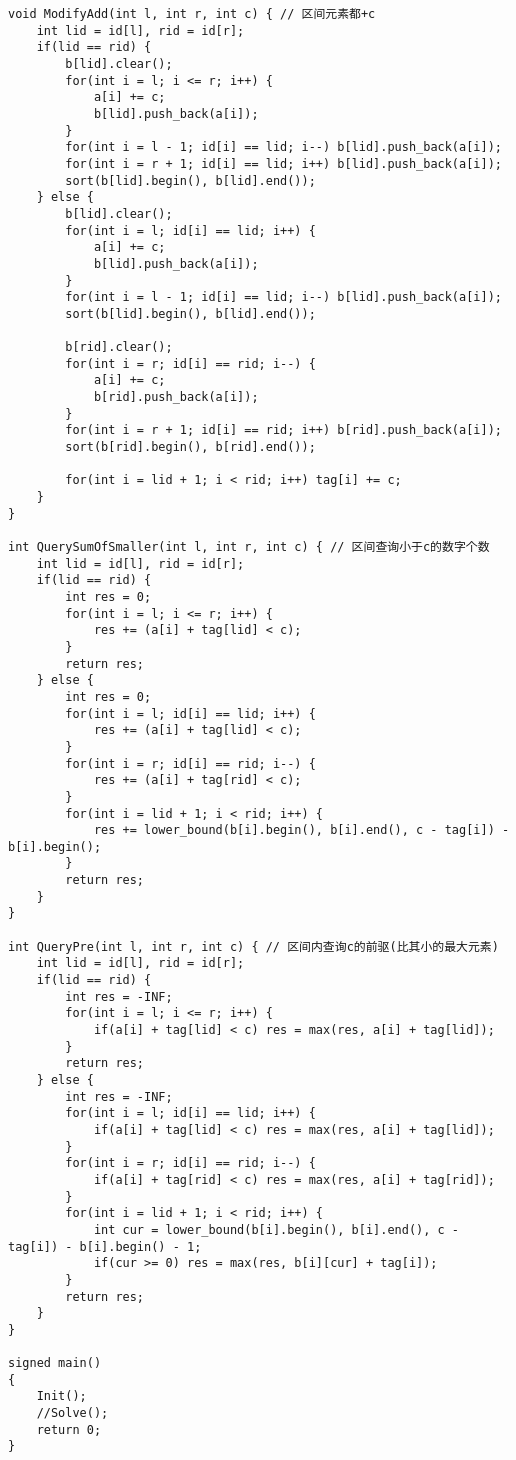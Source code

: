 \begin{lstlisting}
void ModifyAdd(int l, int r, int c) { // 区间元素都+c
	int lid = id[l], rid = id[r];
	if(lid == rid) {
		b[lid].clear();
		for(int i = l; i <= r; i++) {
			a[i] += c;
			b[lid].push_back(a[i]);	
		}
		for(int i = l - 1; id[i] == lid; i--) b[lid].push_back(a[i]);
		for(int i = r + 1; id[i] == lid; i++) b[lid].push_back(a[i]);
		sort(b[lid].begin(), b[lid].end());
	} else {
		b[lid].clear();
		for(int i = l; id[i] == lid; i++) {
			a[i] += c;
			b[lid].push_back(a[i]);
		}
		for(int i = l - 1; id[i] == lid; i--) b[lid].push_back(a[i]);
		sort(b[lid].begin(), b[lid].end());
		
		b[rid].clear();
		for(int i = r; id[i] == rid; i--) {
			a[i] += c;
			b[rid].push_back(a[i]);
		}
		for(int i = r + 1; id[i] == rid; i++) b[rid].push_back(a[i]);
		sort(b[rid].begin(), b[rid].end());
		
		for(int i = lid + 1; i < rid; i++) tag[i] += c;
	}
}

int QuerySumOfSmaller(int l, int r, int c) { // 区间查询小于c的数字个数
	int lid = id[l], rid = id[r];
	if(lid == rid) {
		int res = 0;
		for(int i = l; i <= r; i++) {
			res += (a[i] + tag[lid] < c);
		}
		return res;
	} else {
		int res = 0;
		for(int i = l; id[i] == lid; i++) {
			res += (a[i] + tag[lid] < c);
		}
		for(int i = r; id[i] == rid; i--) {
			res += (a[i] + tag[rid] < c);
		}
		for(int i = lid + 1; i < rid; i++) {
			res += lower_bound(b[i].begin(), b[i].end(), c - tag[i]) - b[i].begin();
		}
		return res;
	}
}

int QueryPre(int l, int r, int c) { // 区间内查询c的前驱(比其小的最大元素)
	int lid = id[l], rid = id[r];
	if(lid == rid) {
		int res = -INF;
		for(int i = l; i <= r; i++) {
			if(a[i] + tag[lid] < c) res = max(res, a[i] + tag[lid]);
		}
		return res;
	} else {
		int res = -INF;
		for(int i = l; id[i] == lid; i++) {
			if(a[i] + tag[lid] < c) res = max(res, a[i] + tag[lid]);
		}
		for(int i = r; id[i] == rid; i--) {
			if(a[i] + tag[rid] < c) res = max(res, a[i] + tag[rid]);
		}
		for(int i = lid + 1; i < rid; i++) {
			int cur = lower_bound(b[i].begin(), b[i].end(), c - tag[i]) - b[i].begin() - 1;
			if(cur >= 0) res = max(res, b[i][cur] + tag[i]);
		}
		return res;	
	}
}

signed main()
{	
	Init();
	//Solve();
	return 0;
}
\end{lstlisting}

